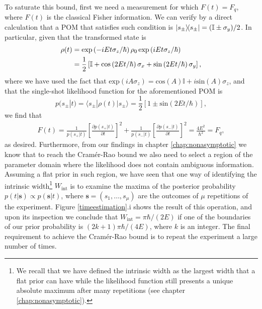 To saturate this bound, first we need a measurement for which $F(t) = F_q$, where $F(t)$ is the classical Fisher information. We can verify by a direct calculation that a POM that satisfies such condition is $\ketbra{s_\pm} = (\mathbb{I} \pm \sigma_y)/2$. In particular, given that the transformed state is
\begin{align}
\rho(t) &= \mathrm{exp}\left(-i E t\sigma_z/\hbar\right)\rho_0\hspace{0.15em}\mathrm{exp}\left(i E t\sigma_z/\hbar\right)
\nonumber \\
&= \frac{1}{2}\left[\mathbb{I} + \mathrm{cos}\left(2 E t/\hbar\right)\sigma_x + \mathrm{sin}\left(2 E t/\hbar\right)\sigma_y\right],
\end{align}
where we have used the fact that $\mathrm{exp}(i A \sigma_z) = \mathrm{cos}(A)\mathbb{I} + i \mathrm{sin}(A)\sigma_z$, and that the single-shot likelihood function for the aforementioned POM is
\begin{equation}
p(s_\pm|t) = \langle s_\pm | \rho(t) | s_\pm \rangle = \frac{1}{2} \left[1 \pm \mathrm{sin}\left(2 E t/\hbar\right)\right],
\end{equation}
we find that
\begin{eqnarray}
F(t) = \frac{1}{p(s_{+}|t)}\left[\frac{\partial p(s_{+}|t)}{\partial t}\right]^2 + \frac{1}{p(s_{-}|t)}\left[\frac{\partial p(s_{-}|t)}{\partial t}\right]^2 = \frac{4 E^2}{\hbar^2} = F_q,
\end{eqnarray}
as desired. Furthermore, from our findings in chapter \ref{chap:nonasymptotic} we know that to reach the Cram\'{e}r-Rao bound we also need to select a region of the parameter domain where the likelihood does not contain ambiguous information. Assuming a flat prior in such region, we have seen that one way of identifying the intrinsic width\footnote{We recall that we have defined the intrinsic width as the largest width that a flat prior can have while the likelihood function still presents a unique absolute maximum after many repetitions (see chapter \ref{chap:nonasymptotic}).} $W_\mathrm{int}$ is to examine the maxima of the posterior probability $p(t|\boldsymbol{s}) \propto p(\boldsymbol{s}| t)$, where $\boldsymbol{s} = (s_1, \dots, s_\mu)$ are the outcomes of $\mu$ repetitions of the experiment. Figure \ref{timeestimation}.i shows the result of this operation, and upon its inspection we  conclude that $W_\mathrm{int} = \pi \hbar/(2E)$ if one of the boundaries of our prior probability is $(2k+1)\pi \hbar/(4E)$, where $k$ is an integer. The final requirement to achieve the Cram\'{e}r-Rao bound is to repeat the experiment a large number of times. 
 
